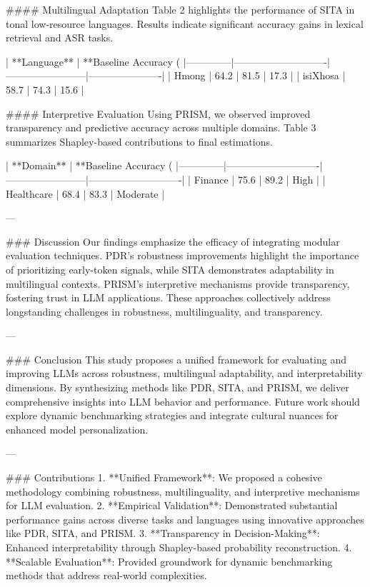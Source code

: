 #### Multilingual Adaptation  
Table 2 highlights the performance of SITA in tonal low-resource languages. Results indicate significant accuracy gains in lexical retrieval and ASR tasks.

| **Language** | **Baseline Accuracy (%
|--------------|----------------------------|------------------------|----------------------|
| Hmong        | 64.2                       | 81.5                   | 17.3                 |
| isiXhosa     | 58.7                       | 74.3                   | 15.6                 |

#### Interpretive Evaluation  
Using PRISM, we observed improved transparency and predictive accuracy across multiple domains. Table 3 summarizes Shapley-based contributions to final estimations.

| **Domain**   | **Baseline Accuracy (%
|--------------|----------------------------|------------------------|----------------------------|
| Finance      | 75.6                       | 89.2                   | High                       |
| Healthcare   | 68.4                       | 83.3                   | Moderate                   |

---

### Discussion  
Our findings emphasize the efficacy of integrating modular evaluation techniques. PDR's robustness improvements highlight the importance of prioritizing early-token signals, while SITA demonstrates adaptability in multilingual contexts. PRISM's interpretive mechanisms provide transparency, fostering trust in LLM applications. These approaches collectively address longstanding challenges in robustness, multilinguality, and transparency.

---

### Conclusion  
This study proposes a unified framework for evaluating and improving LLMs across robustness, multilingual adaptability, and interpretability dimensions. By synthesizing methods like PDR, SITA, and PRISM, we deliver comprehensive insights into LLM behavior and performance. Future work should explore dynamic benchmarking strategies and integrate cultural nuances for enhanced model personalization.

---

### Contributions  
1. **Unified Framework**: We proposed a cohesive methodology combining robustness, multilinguality, and interpretive mechanisms for LLM evaluation.
2. **Empirical Validation**: Demonstrated substantial performance gains across diverse tasks and languages using innovative approaches like PDR, SITA, and PRISM.
3. **Transparency in Decision-Making**: Enhanced interpretability through Shapley-based probability reconstruction.
4. **Scalable Evaluation**: Provided groundwork for dynamic benchmarking methods that address real-world complexities.